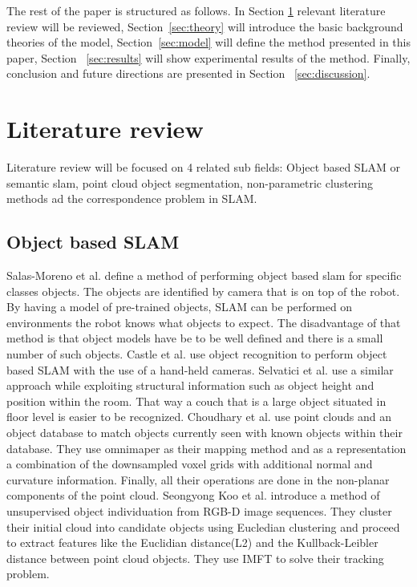 \documentclass[]{article}
\begin{document}
The rest of the paper is structured as follows. In Section \ref{sec:literature} relevant literature review will be reviewed, Section~\ref{sec:theory} will introduce the basic background theories of the model, Section~\ref{sec:model} will define the method presented in this paper, Section ~\ref{sec:results} will show experimental results of the method. Finally, conclusion and future directions are presented in Section ~\ref{sec:discussion}.

\section{Literature review}
\label{sec:literature}
Literature review will be focused on 4 related sub fields: Object based SLAM or semantic slam, point cloud object segmentation, non-parametric clustering methods ad the correspondence problem in SLAM.

\subsection{Object based SLAM}
Salas-Moreno et al.\cite{slam++} define a method of performing object based slam for specific classes objects. The objects are identified by camera that is on top of the robot. By having a model of pre-trained objects, SLAM can be performed on environments the robot knows what objects to expect. The disadvantage of that method is that object models have be to be well defined and there is a small number of such objects. 
Castle et al. use object recognition to perform object based SLAM with the use of a hand-held cameras. Selvatici et al.\cite{objslam} use a similar approach while exploiting structural information such as object height and position within the room. That way a couch that is a large object situated in floor level is easier to be recognized.
Choudhary et al.\cite{objectpointslam} use point clouds and an object database to match objects currently seen with known objects within their database. They use omnimaper\cite{omnimaper} as their mapping method and as a representation a combination of the downsampled  voxel grids with additional normal and curvature information.  Finally, all their operations are done in the non-planar components of the point cloud.
Seongyong Koo et al.\cite{objectDisc} introduce a method of unsupervised object individuation from RGB-D image sequences. They cluster their initial cloud into candidate objects using Eucledian clustering and proceed to extract features like the Euclidian distance(L2) and the Kullback-Leibler distance between point cloud objects. They use IMFT to solve their tracking problem.
\end{document}
